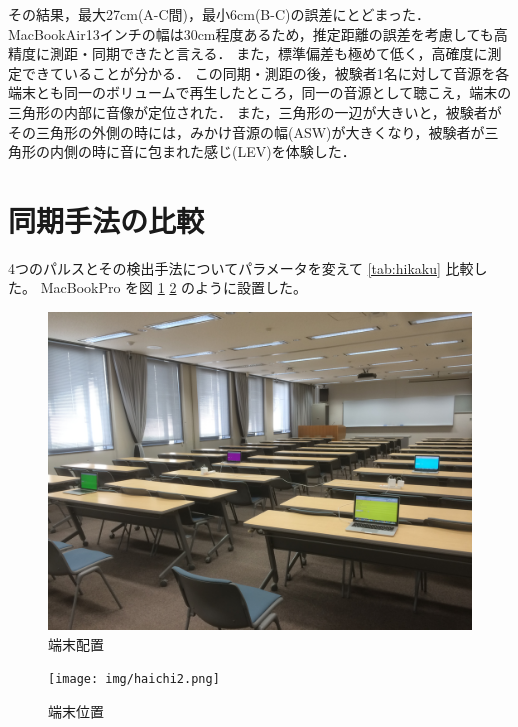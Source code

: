 その結果，最大27cm(A-C間)，最小6cm(B-C)の誤差にとどまった．
MacBookAir13インチの幅は30cm程度あるため，推定距離の誤差を考慮しても高精度に測距・同期できたと言える．
また，標準偏差も極めて低く，高確度に測定できていることが分かる．
この同期・測距の後，被験者1名に対して音源を各端末とも同一のボリュームで再生したところ，同一の音源として聴こえ，端末の三角形の内部に音像が定位された．
また，三角形の一辺が大きいと，被験者がその三角形の外側の時には，みかけ音源の幅(ASW)が大きくなり，被験者が三角形の内側の時に音に包まれた感じ(LEV)を体験した．


\section{同期手法の比較}


4つのパルスとその検出手法についてパラメータを変えて \ref{tab:hikaku} 比較した。
MacBookPro を図 \ref{fig:haichi1} \ref{fig:haichi2} のように設置した。

\begin{figure}[p]
  \centering
  \includegraphics[clip,width=1.05\hsize]{img/haichi1.jpg}
  \caption{端末配置}\label{fig:haichi1}
\end{figure}

\begin{figure}[p]
  \centering
  \texttt{[image: img/haichi2.png]}
  \caption{端末位置}\label{fig:haichi2}
\end{figure}

